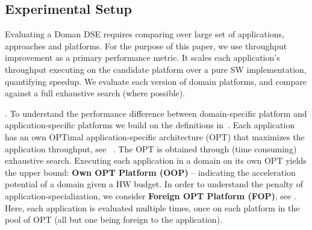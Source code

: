 \subsection{Experimental Setup}

Evaluating a Doman DSE requires comparing over large set of applications, approaches and platforms. For the purpose of this paper, we use throughput improvement as a primary performance metric. It scales each application's throughput executing on the candidate platform over a pure SW implementation, quantifying speedup. We evaluate  each version of \ga domain platforms, 
and compare against a full exhaustive search (where possible).

 .
To understand the performance difference between domain-specific platform and application-specific platforms we build on the definitions in~\cite{zhang100ds}. Each application has an own OPTimal application-specific architecture (OPT) that maximizes the application throughput, see ~. 
The OPT is obtained through (time consuming) exhaustive search. 
Executing each application in a domain on its own OPT yields the upper bound: \textbf{Own OPT Platform (OOP)} -- indicating the acceleration potential of a domain given a HW budget. In order to understand the penalty of application-specialization, we consider \textbf{Foreign OPT Platform (FOP)}, see . Here, each application is evaluated multiple times, once on each platform in the pool of OPT (all but one being foreign to the application).



